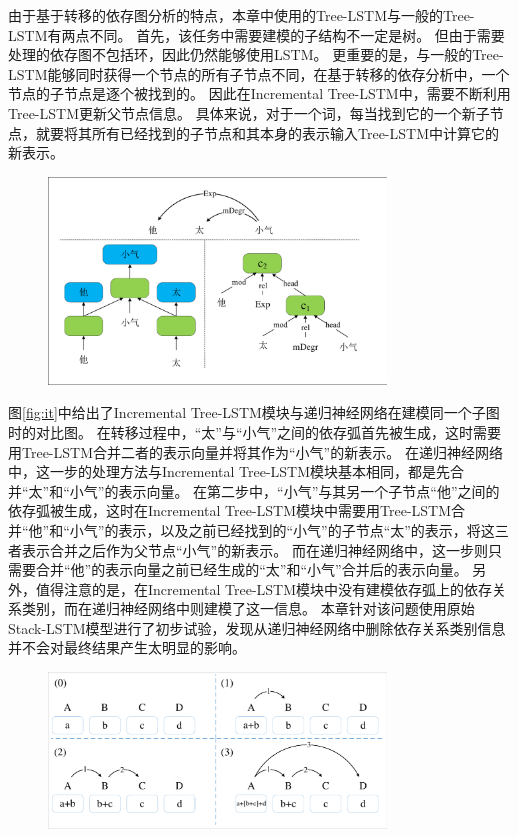 由于基于转移的依存图分析的特点，本章中使用的Tree-LSTM与一般的Tree-LSTM有两点不同。
首先，该任务中需要建模的子结构不一定是树。
但由于需要处理的依存图不包括环，因此仍然能够使用LSTM。
更重要的是，与一般的Tree-LSTM能够同时获得一个节点的所有子节点不同，在基于转移的依存分析中，一个节点的子节点是逐个被找到的。
因此在Incremental Tree-LSTM中，需要不断利用Tree-LSTM更新父节点信息。
具体来说，对于一个词，每当找到它的一个新子节点，就要将其所有已经找到的子节点和其本身的表示输入Tree-LSTM中计算它的新表示。

\begin{figure}[hbtp]
	\centering
	\includegraphics[width=0.8\textwidth]{figures/it.pdf}
\end{figure}

图\ref{fig:it}中给出了Incremental Tree-LSTM模块与递归神经网络在建模同一个子图时的对比图。
在转移过程中，“太”与“小气”之间的依存弧首先被生成，这时需要用Tree-LSTM合并二者的表示向量并将其作为“小气”的新表示。
在递归神经网络中，这一步的处理方法与Incremental Tree-LSTM模块基本相同，都是先合并“太”和“小气”的表示向量。
在第二步中，“小气”与其另一个子节点“他”之间的依存弧被生成，这时在Incremental Tree-LSTM模块中需要用Tree-LSTM合并“他”和“小气”的表示，以及之前已经找到的“小气”的子节点“太”的表示，将这三者表示合并之后作为父节点“小气”的新表示。
而在递归神经网络中，这一步则只需要合并“他”的表示向量之前已经生成的“太”和“小气”合并后的表示向量。
另外，值得注意的是，在Incremental Tree-LSTM模块中没有建模依存弧上的依存关系类别，而在递归神经网络中则建模了这一信息。
本章针对该问题使用原始Stack-LSTM模型进行了初步试验，发现从递归神经网络中删除依存关系类别信息并不会对最终结果产生太明显的影响。

\begin{figure}[hbtp]
	\centering
	\includegraphics[width=0.8\textwidth]{figures/it-example.pdf}
\end{figure}

